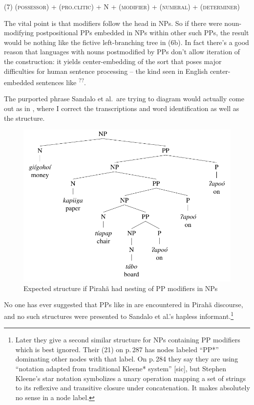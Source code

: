 \documentclass[output=paper,colorlinks,citecolor=brown
]{langscibook}
\begin{document}
\medskip\noindent
(7)\quad
(\textsc{possessor}) + (\textsc{pro.clitic}) + N + (\textsc{modifier})
+ (\textsc{numeral}) + (\textsc{determiner})

\medskip\noindent
The vital point is that modifiers follow the head in NPs. So if there
were noun-modifying postpositional PPs embedded in NPs within other
such PPs, the result would be nothing like the fictive left-branching
tree in (6b). In fact there's a good reason that languages with nouns
postmodified by PPs don't allow iteration of the construction: it
yields center-embedding of the sort that poses major difficulties for
human sentence processing -- the kind seen in English center-embedded
sentences like \textsuperscript{??}.

The purported phrase Sandalo et al.\ are trying to diagram would
actually come out as in , where I correct the transcriptions
and word identification as well as the structure.

\begin{figure}
\includegraphics[width=\textwidth]{figures/pullum_figure3.pdf}
\caption{Expected structure if Pirah{\~a} had nesting of PP modifiers in NPs}
\label{fig:pullum:3}
\end{figure}

No one has ever suggested that PPs like in  are encountered 
in Pirah{\~a}
discourse, and no such structures were presented to Sandalo et al.'s
hapless informant.\footnote{%
   Later they give a second similar structure for NPs containing PP
   modifiers which is best ignored. Their (21) on p.\,287 has nodes
   labeled ``PP*'' dominating other nodes with that label. On p.\,284
   they say they are using ``notation adapted from traditional Kleene*
   system'' [sic], but Stephen Kleene's star notation symbolizes a
   unary operation mapping a set of strings to its reflexive and
   transitive closure under concatenation. It makes absolutely no
   sense in a node label.}
\end{document}
